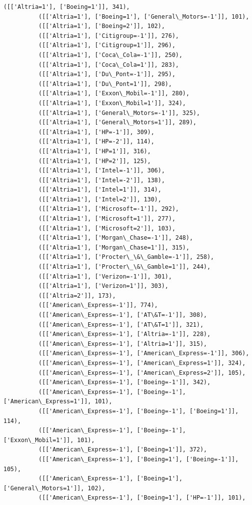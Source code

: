 \documentclass[11pt]{article}
\begin{document}
\begin{Verbatim}[commandchars=\\\{\}]
          ([['Altria=1'], ['Boeing=1']], 341),
          ([['Altria=1'], ['Boeing=1'], ['General\_Motors=-1']], 101),
          ([['Altria=1'], ['Boeing=2']], 102),
          ([['Altria=1'], ['Citigroup=-1']], 276),
          ([['Altria=1'], ['Citigroup=1']], 296),
          ([['Altria=1'], ['Coca\_Cola=-1']], 250),
          ([['Altria=1'], ['Coca\_Cola=1']], 283),
          ([['Altria=1'], ['Du\_Pont=-1']], 295),
          ([['Altria=1'], ['Du\_Pont=1']], 298),
          ([['Altria=1'], ['Exxon\_Mobil=-1']], 280),
          ([['Altria=1'], ['Exxon\_Mobil=1']], 324),
          ([['Altria=1'], ['General\_Motors=-1']], 325),
          ([['Altria=1'], ['General\_Motors=1']], 289),
          ([['Altria=1'], ['HP=-1']], 309),
          ([['Altria=1'], ['HP=-2']], 114),
          ([['Altria=1'], ['HP=1']], 316),
          ([['Altria=1'], ['HP=2']], 125),
          ([['Altria=1'], ['Intel=-1']], 306),
          ([['Altria=1'], ['Intel=-2']], 138),
          ([['Altria=1'], ['Intel=1']], 314),
          ([['Altria=1'], ['Intel=2']], 130),
          ([['Altria=1'], ['Microsoft=-1']], 292),
          ([['Altria=1'], ['Microsoft=1']], 277),
          ([['Altria=1'], ['Microsoft=2']], 103),
          ([['Altria=1'], ['Morgan\_Chase=-1']], 248),
          ([['Altria=1'], ['Morgan\_Chase=1']], 315),
          ([['Altria=1'], ['Procter\_\&\_Gamble=-1']], 258),
          ([['Altria=1'], ['Procter\_\&\_Gamble=1']], 244),
          ([['Altria=1'], ['Verizon=-1']], 301),
          ([['Altria=1'], ['Verizon=1']], 303),
          ([['Altria=2']], 173),
          ([['American\_Express=-1']], 774),
          ([['American\_Express=-1'], ['AT\&T=-1']], 308),
          ([['American\_Express=-1'], ['AT\&T=1']], 321),
          ([['American\_Express=-1'], ['Altria=-1']], 228),
          ([['American\_Express=-1'], ['Altria=1']], 315),
          ([['American\_Express=-1'], ['American\_Express=-1']], 306),
          ([['American\_Express=-1'], ['American\_Express=1']], 324),
          ([['American\_Express=-1'], ['American\_Express=2']], 105),
          ([['American\_Express=-1'], ['Boeing=-1']], 342),
          ([['American\_Express=-1'], ['Boeing=-1'], ['American\_Express=1']], 101),
          ([['American\_Express=-1'], ['Boeing=-1'], ['Boeing=1']], 114),
          ([['American\_Express=-1'], ['Boeing=-1'], ['Exxon\_Mobil=1']], 101),
          ([['American\_Express=-1'], ['Boeing=1']], 372),
          ([['American\_Express=-1'], ['Boeing=1'], ['Boeing=-1']], 105),
          ([['American\_Express=-1'], ['Boeing=1'], ['General\_Motors=1']], 102),
          ([['American\_Express=-1'], ['Boeing=1'], ['HP=-1']], 101),

\end{Verbatim}
\end{document}
